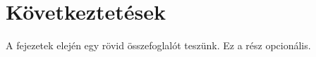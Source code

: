 \chapter{Következtetések}\label{ch:ALAP}

\begin{osszefoglal}
	A fejezetek elején egy rövid összefoglalót teszünk. Ez a rész opcionális.
	
\end{osszefoglal}

